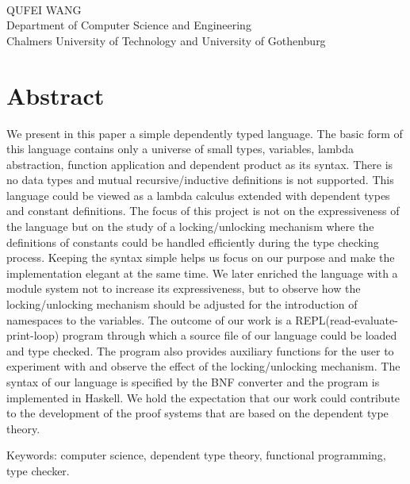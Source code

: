 \oneLineTitle\\
QUFEI WANG\\
Department of Computer Science and Engineering\\
Chalmers University of Technology and University of Gothenburg\setlength{\parskip}{0.5cm}

\thispagestyle{plain}			%
\setlength{\parskip}{0pt plus 1.0pt}
\section*{Abstract}
We present in this paper a simple dependently typed language. The basic form of this language contains only a universe of small types, variables, lambda abstraction, function application and dependent product as its syntax. There is no data types and mutual recursive/inductive definitions is not supported. This language could be viewed as a lambda calculus extended with dependent types and constant definitions. The focus of this project is not on the expressiveness of the language but on the study of a locking/unlocking mechanism where the definitions of constants could be handled efficiently during the type checking process. Keeping the syntax simple helps us focus on our purpose and make the implementation elegant at the same time. We later enriched the language with a module system not to increase its expressiveness, but to observe how the locking/unlocking mechanism should be adjusted for the introduction of namespaces to the variables. The outcome of our work is a REPL(read-evaluate-print-loop) program through which a source file of our language could be loaded and type checked. The program also provides auxiliary functions for the user to experiment with and observe the effect of the locking/unlocking mechanism. The syntax of our language is specified by the BNF converter and the program is implemented in Haskell. We hold the expectation that our work could contribute to the development of the proof systems that are based on the dependent type theory.

\vfill
Keywords: computer science, dependent type theory, functional programming, type checker.

\newpage				%
\thispagestyle{empty}
\mbox{}